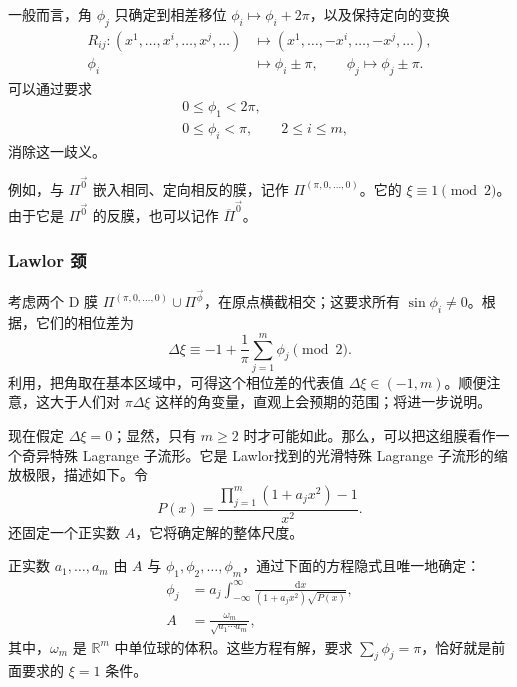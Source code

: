 一般而言，角 $\phi_j$ 只确定到相差移位 $\phi_i\mapsto\phi_i+2\pi$，以及保持定向的变换
\[
\begin{aligned}
R_{ij}\colon(x^1,\ldots,x^i,\ldots,x^j,\ldots)
&\longmapsto(x^1,\ldots,-x^i,\ldots,-x^j,\ldots),\\
\phi_i&\longmapsto\phi_i\pm\pi,\qquad
\phi_j\longmapsto\phi_j\pm\pi.
\end{aligned}
\]
可以通过要求
\begin{equation}\label{eq:5.23}
\begin{aligned}
&0\le\phi_1<2\pi,\\
&0\le\phi_i<\pi,\qquad 2\le i\le m,
\end{aligned}
\end{equation}
消除这一歧义。

例如，与 $\Pi^{\vec 0}$ 嵌入相同、定向相反的膜，记作 $\Pi^{(\pi,0,\ldots,0)}$。它的 $\xi\equiv1\pmod2$。由于它是 $\Pi^{\vec 0}$ 的反膜，也可以记作 $\overline\Pi^{\vec 0}$。

\subsubsection{Lawlor 颈}\label{sec:5.2.1.4}

考虑两个 D 膜 $\Pi^{(\pi,0,\ldots,0)}\cup\Pi^{\vec\phi}$，在原点横截相交；这要求所有 $\sin\phi_i\ne0$。根据，它们的相位差为
\begin{equation}\label{eq:5.24}
\Delta\xi\equiv-1+\frac{1}{\pi}\sum_{j=1}^m\phi_j\pmod2.
\end{equation}
利用，把角取在基本区域中，可得这个相位差的代表值 $\Delta\xi\in(-1,m)$。顺便注意，这大于人们对 $\pi\Delta\xi$ 这样的角变量，直观上会预期的范围；将进一步说明。

现在假定 $\Delta\xi=0$；显然，只有 $m\ge2$ 时才可能如此。那么，可以把这组膜看作一个奇异特殊 Lagrange 子流形。它是 Lawlor找到的光滑特殊 Lagrange 子流形的缩放极限，描述如下。令
\begin{equation}\label{eq:5.25}
P(x)=\frac{\prod_{j=1}^m(1+a_jx^2)-1}{x^2}.
\end{equation}
还固定一个正实数 $A$，它将确定解的整体尺度。

正实数 $a_1,\ldots,a_m$ 由 $A$ 与 $\phi_1,\phi_2,\ldots,\phi_m$，通过下面的方程隐式且唯一地确定：
\begin{equation}\label{eq:5.26}
\begin{aligned}
\phi_j&=a_j\int_{-\infty}^{\infty}
\frac{\mathrm{d}x}{(1+a_jx^2)\sqrt{P(x)}},\\
A&=\frac{\omega_m}{\sqrt{a_1\cdots a_m}},
\end{aligned}
\end{equation}
其中，$\omega_m$ 是 $\mathbb{R}^m$ 中单位球的体积。这些方程有解，要求 $\sum_j\phi_j=\pi$，恰好就是前面要求的 $\xi=1$ 条件。


